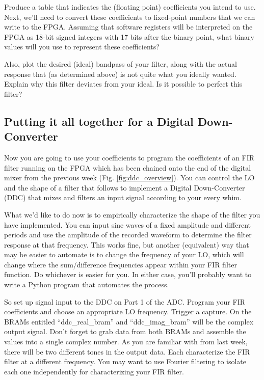 \documentclass[11pt]{article}
\begin{document}
Produce a table that indicates the (floating point) coefficients you intend to
use.  Next, we'll need to convert these coefficients to fixed-point numbers
that we can write to the FPGA.  Assuming that software registers will be
interpreted on the FPGA as 18-bit signed integers with 17 bits after the binary
point, what binary values will you use to represent these coefficients?

Also, plot the desired (ideal) bandpass of your filter, along with the actual
response that (as determined above) is not quite what you ideally wanted.
Explain why this filter deviates from your ideal.  Is it possible to perfect
this filter?

\subsection{Putting it all together for a Digital Down-Converter} \label{ddc}

Now you are going to use your coefficients to program the coefficients of an FIR filter running on the
FPGA which has been chained onto the end of the digital mixer from the previous week (Fig. \ref{fig:ddc_overview}).  
You can control
the LO and the shape of a filter that follows to implement a Digital Down-Converter (DDC) that mixes and filters
an input signal according to your every whim.

What we'd like to do now is to empirically characterize the shape of the filter you have implemented.  
You can input sine waves of a fixed amplitude and different periods and use the amplitude of the recorded
waveform to determine the filter response at that frequency.  This works fine, but another (equivalent) way
that may be easier to automate is to change the frequency of your LO, which will change where the sum/difference
frequencies appear within your FIR filter function.  Do whichever is easier for you.  In either case, you'll
probably want to write a Python program that automates the process.

So set up signal input to the DDC on Port 1 of the ADC.  Program your FIR coefficients and choose an appropriate
LO frequency.  Trigger a capture.  On the BRAMs entitled ``ddc\_real\_bram'' and ``ddc\_imag\_bram''
will be the complex output signal.  Don't forget to grab data from both BRAMs and assemble the values
into a single complex number.  As you are familiar with from last week, there will be two different tones
in the output data.  Each characterize the FIR filter at a different frequency.  You may want to use
Fourier filtering to isolate each one independently for characterizing your FIR filter.
\end{document}
